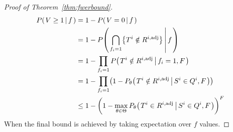 \documentclass[ejs, twoside]{imsart}
\theoremstyle{plain}
\theoremstyle{remark}
\newcommand{\cond}[2]{\left.{#1}\,\middle|\,{#2}\right.}
\numberwithin{equation}{section}
\numberwithin{table}{section}
\numberwithin{figure}{section}
\let\originalleft\left
\let\originalright\right
\renewcommand{\left}{\mathopen{}\mathclose\bgroup\originalleft}
\renewcommand{\right}{\aftergroup\egroup\originalright}
\begin{document}
\begin{appendix}
\begin{proof}[Proof of Theorem~\ref{thm:fwerbound}]
	\begin{align*}
		P\left(\cond{
			V \geq 1
		}{
			f
		}\right)
		&= 1 - P\left(\cond{V = 0}{f}\right) \\
		&= 1 - P\left( \cond{
			\bigcap_{f_i=1} \left\lbrace  T^i \notin R^{i,\text{adj}} \right\rbrace 
		}{f} \right) \\
		&= 1 - \prod_{f_i=1} P\left( \cond{
			T^{i} \notin R^{i,\text{adj}}
		}{f_i = 1, F} \right) \\
		&= 1 - \prod_{f_i=1} \left( 1- P_{\theta}\left( \cond{T^{i} \notin R^{i,\text{adj}}}{S^i \in Q^i, F} \right)\right)  \\
		&\leq 1 - \left( 1- \max_{\theta\in\Theta} P_{\theta}\left( \cond{T^{i} \in R^{i,\text{adj}}}{S^i \in Q^i , F} \right)\right) ^F
	\end{align*}
	When the final bound is achieved by taking expectation over \(f\) values.
\end{proof}


\end{appendix}
\end{document}
